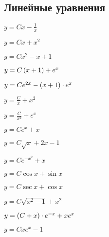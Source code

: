 \subsection*{Линейные уравнения}

	\label{sol:firstorder:linear}
	\begin{enumsols}

		\item \( y = Cx - \frac{1}{x} \) %
		\item \( y = Cx + x^2 \) %
		\item \( y = Cx^2 - x + 1 \) %
		\item \( y = C \left( x + 1 \right) + e^{x} \) %
		\item \( y = C e^{2x} - \left( x + 1 \right) \cdot e^{x} \) %
		\item \( y = \frac{C}{x} + x^2 \) %
		\item \( y = \frac{C}{x^2} + e^{x} \) %
		\item \( y = C e^{x} + x \) %
		\item \( y = C \sqrt{x} + 2x - 1 \) %
		\item \( y = Ce^{-x^2} + x \) %
		\item \( y = C\cos{x} + \sin{x} \) %
		\item \( y = C \sec{x} + \cos{x} \) %
		\item \( y = C \sqrt{x^2 - 1} + x^2 \) %
		\item \( y = \left( C + x \right) \cdot e^{-x} + xe^{x} \) %
		\item \( y = Cxe^{x} - 1 \) %


\end{enumsols}
